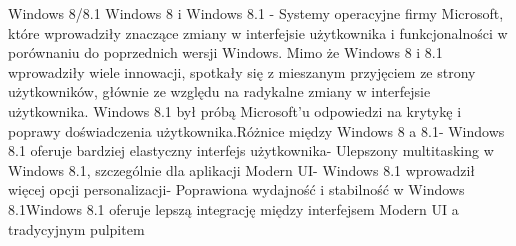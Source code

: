 \begin{frame}{Windows 8/8.1}
Windows 8 i Windows 8.1 - Systemy operacyjne firmy Microsoft, które wprowadziły znaczące zmiany w interfejsie użytkownika i funkcjonalności w porównaniu do poprzednich wersji Windows. Mimo że Windows 8 i 8.1 wprowadziły wiele innowacji, spotkały się z mieszanym przyjęciem ze strony użytkowników, głównie ze względu na radykalne zmiany w interfejsie użytkownika. Windows 8.1 był próbą Microsoft'u odpowiedzi na krytykę i poprawy doświadczenia użytkownika.Różnice między Windows 8 a 8.1- Windows 8.1 oferuje bardziej elastyczny interfejs użytkownika- Ulepszony multitasking w Windows 8.1, szczególnie dla aplikacji Modern UI- Windows 8.1 wprowadził więcej opcji personalizacji- Poprawiona wydajność i stabilność w Windows 8.1Windows 8.1 oferuje lepszą integrację między interfejsem Modern UI a tradycyjnym pulpitem

\end{frame}

